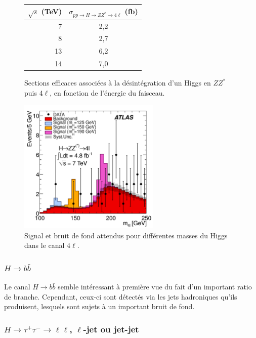 \documentclass[11pt]{article} %
\begin{document}
\begin{figure}[H]
\centering
\begin{tabular}{|r|c|} 
   \hline
   $\sqrt{s}$ (TeV) & $\sigma_{pp \to H \to ZZ^* \to 4\ell}$ (fb) \\
    \hline
   7 &  2,2\\
\hline
   8 & 2,7 \\
\hline
   13 & 6,2  \\
\hline
   14 & 7,0 \\
  \hline
\end{tabular}
\caption{Sections efficaces associées à la désintégration d'un Higgs en $ZZ^*$ puis 4$\ell$, en fonction de l'énergie du faisceau.}
\end{figure}

\begin{figure}[H]
\centering
  \caption{Signal et bruit de fond attendus pour différentes masses du Higgs dans le canal $4\ell$. \cite{atlas_zz_llll}}
 \includegraphics[width=0.6\textwidth]{../images/atlas_llll_events.png}
\end{figure}


\subsubsection{$H \to b\bar{b}$}

Le canal $H \to b\bar{b}$ semble intéressant à première vue du fait d'un important ratio de branche. Cependant, ceux-ci sont détectés via les jets hadroniques qu'ils produisent, lesquels sont sujets à un important bruit de fond.

\subsubsection{$H \to \tau^+\tau^- \to \ell\ell$, $\ell$-jet ou jet-jet}
\end{document}
